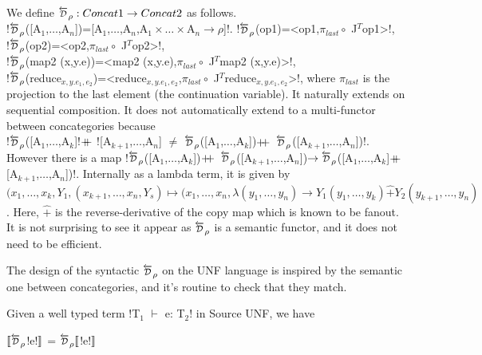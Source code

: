 \begin{definition}
    We define $\Dsynrevsymbol_{\rho}:\ConcatS\to\ConcatT$ as follows.\\
    !$\Dsynrevsymbol_{\rho}$([A$_1$,$\ldots$,A$_n$])=[A$_1$,$\ldots$,A$_n$,A$_1\times\ldots\times$A$_n\to \rho$]!.
    !$\Dsynrevsymbol_{\rho}$(op1)=<op1,$\pi_{last}\circ$ J$^T$op1>!,\\ 
    !$\Dsynrevsymbol_{\rho}$(op2)=<op2,$\pi_{last}\circ$ J$^T$op2>!,\\
    !$\Dsynrevsymbol_{\rho}$(map2 (x,y.e))=<map2 (x,y.e),$\pi_{last}\circ$ J$^T$map2 (x,y.e)>!,\\
    !$\Dsynrevsymbol_{\rho}$(reduce$_{x,y.e_1,e_2}$)=<reduce$_{x,y.e_1,e_2}$,$\pi_{last}\circ$ J$^T$reduce$_{x,y.e_1,e_2}$>!, 
    where $\pi_{last}$ is the projection to the last element (the continuation variable).
    It naturally extends on sequential composition. 
    It does not automatically extend to a multi-functor between concategories because \\
    !$\Dsynrevsymbol_{\rho}$([A$_1$,$\ldots$,A$_k$]!{$+\kern-1.3ex+\kern0.8ex$}![A$_{k+1}$,$\ldots$,A$_n$] $\neq$ $\Dsynrevsymbol_{\rho}$([A$_1$,$\ldots$,A$_k$])$\concatcomp\Dsynrevsymbol_{\rho}$([A$_{k+1}$,$\ldots$,A$_n$])!.\\
    However there is a map !$\Dsynrevsymbol_{\rho}$([A$_1$,$\ldots$,A$_k$])$\concatcomp \Dsynrevsymbol_{\rho}$([A$_{k+1}$,$\ldots$,A$_n$])$\to \Dsynrevsymbol_{\rho}$([A$_1$,$\ldots$,A$_k$]$+\kern-1.3ex+\kern0.8ex$[A$_{k+1}$,$\ldots$,A$_n$])!.
    Internally as a lambda term, it is given by \\
    $(x_1,\ldots,x_k,Y_1,(x_{k+1},\ldots,x_n,Y_s)\mapsto (x_1,\ldots,x_n,\lambda(y_1,\ldots,y_n)\to Y_1(y_1,\ldots,y_k)\widehat{+}Y_2(y_{k+1},\ldots,y_n)$.
    Here, $\widehat{+}$ is the reverse-derivative of the copy map which is known to be fanout. 
    It is not surprising to see it appear as $\Dsynrevsymbol_{\rho}$ is a semantic functor, and it does not need to be efficient. 
\end{definition}

The design of the syntactic $\Dsynrevsymbol_{\rho}$ on the UNF language is inspired by the semantic one between concategories, 
and it's routine to check that they match. 

\begin{proposition}
    Given a well typed term !T$_1$ $\vdash$ e: T$_2$! in Source UNF, we have
    \begin{center}
        $\seml\Dsynrevsymbol_{\rho}$!e!$\rrbracket$ = $\Dsynrevsymbol_{\rho}\seml$!e!$\rrbracket$
    \end{center}
\end{proposition}

